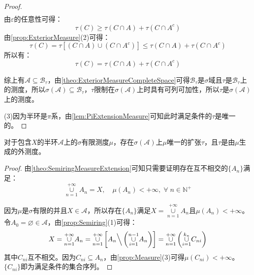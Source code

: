 \begin{proof}
\begin{align*}
	\end{align*}
	由$\varepsilon$的任意性可得：
	\begin{equation*}
		\tau(C)\geqslant\tau(C\cap A)+\tau(C\cap A^c)
	\end{equation*}
	由\cref{prop:ExteriorMeasure}(2)可得：
	\begin{equation*}
		\tau(C)=\tau[(C\cap A)\cup(C\cap A^c)]\leqslant\tau(C\cap A)+\tau(C\cap A^c)
	\end{equation*}
	所以有：
	\begin{equation*}
		\tau(C)=\tau(C\cap A)+\tau(C\cap A^c)
	\end{equation*}\par
	综上有$\mathscr{A}\subseteq\mathscr{B}_\tau$，由\cref{theo:ExteriorMeasureCompleteSpace}可得$\mathscr{B}_\tau$是$\sigma$域且$\tau$是$\mathscr{B}_\tau$上的测度，所以$\sigma(\mathscr{A})\subseteq\mathscr{B}_\tau$，$\tau$限制在$\sigma(\mathscr{A})$上时具有可列可加性，所以$\tau$是$\sigma(\mathscr{A})$上的测度。\par
	(3)因为半环是$\pi$系，由\cref{lem:PiExtensionMeasure}可知此时满足条件的$\tau$是唯一的。
\end{proof}
\begin{corollary}\label{cor:SemiringMeasureExtension}
	对于包含$X$的半环$\mathscr{A}$上的$\sigma$有限测度$\mu$，存在$\sigma(\mathscr{A})$上$\mu$唯一的扩张$\tau$，且$\tau$是由$\mu$生成的外测度。
\end{corollary}
\begin{proof}
	由\cref{theo:SemiringMeasureExtension}可知只需要证明存在互不相交的$\{A_n\}$满足：
	\begin{equation*}
		\underset{n=1}{\overset{+\infty}{\cup}}A_n=X,\quad\mu(A_n)<+\infty,\;\forall\;n\in\mathbb{N}^+
	\end{equation*}\par
	因为$\mu$是$\sigma$有限的并且$X\in\mathscr{A}$，所以存在$\{A_n\}$满足$X=\underset{n=1}{\overset{+\infty}{\cup}}A_n$且$\mu(A_n)<+\infty$。令$A_0=\varnothing\in\mathscr{A}$，由\cref{prop:Semiring}(1)可得：
	\begin{equation*}
		X=\underset{n=1}{\overset{+\infty}{\cup}}A_n=\underset{n=1}{\overset{+\infty}{\cup}}\left[A_n\Big\backslash\left(\underset{i=1}{\overset{n-1}{\cup}}A_n\right)\right]=\underset{n=1}{\overset{+\infty}{\cup}}\left(\underset{i=1}{\overset{k_n}{\cup}}C_{ni}\right)
	\end{equation*}
	其中$C_{ni}$互不相交。因为$C_{ni}\subseteq A_n$，由\cref{prop:Measure}(3)可得$\mu(C_{ni})<+\infty$。$\{C_{ni}\}$即为满足条件的集合序列。
\end{proof}
